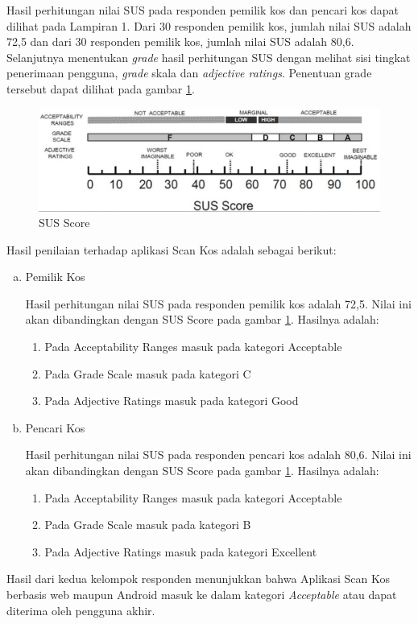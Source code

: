 	Hasil perhitungan nilai SUS pada responden pemilik kos dan pencari kos dapat dilihat pada Lampiran 1. Dari 30 responden pemilik kos, jumlah nilai SUS adalah 72,5 dan dari 30 responden pemilik kos, jumlah nilai SUS adalah 80,6. Selanjutnya menentukan \textit{grade} hasil perhitungan SUS dengan melihat sisi tingkat penerimaan pengguna, \textit{grade }skala dan \textit{adjective ratings}. Penentuan grade tersebut dapat dilihat pada gambar \ref{susScore}.
	
	\begin{figure}[H]
		\centering
		\includegraphics[width=\textwidth]{gambar/susscore}
		\caption{SUS Score}
		\label{susScore}
	\end{figure}

	Hasil penilaian terhadap aplikasi Scan Kos adalah sebagai berikut:
	\begin{enumerate}[a.]
		\item Pemilik Kos
		
		Hasil perhitungan nilai SUS pada responden pemilik kos adalah 72,5. Nilai ini akan dibandingkan dengan SUS Score pada gambar \ref{susScore}. Hasilnya adalah:
		\begin{enumerate}[-]
			\item Pada Acceptability Ranges masuk pada kategori Acceptable
			\item Pada Grade Scale masuk pada kategori C
			\item Pada Adjective Ratings masuk pada kategori Good
		\end{enumerate}
		\item Pencari Kos
		
		Hasil perhitungan nilai SUS pada responden pencari kos adalah 80,6. Nilai ini akan dibandingkan dengan SUS Score pada gambar \ref{susScore}. Hasilnya adalah:
		\begin{enumerate}[-]
			\item Pada Acceptability Ranges masuk pada kategori Acceptable
			\item Pada Grade Scale masuk pada kategori B
			\item Pada Adjective Ratings masuk pada kategori Excellent
		\end{enumerate}
	\end{enumerate}

	Hasil dari kedua kelompok responden menunjukkan bahwa Aplikasi Scan Kos berbasis web maupun Android masuk ke dalam kategori \textit{Acceptable }atau dapat diterima oleh pengguna akhir. 
	

